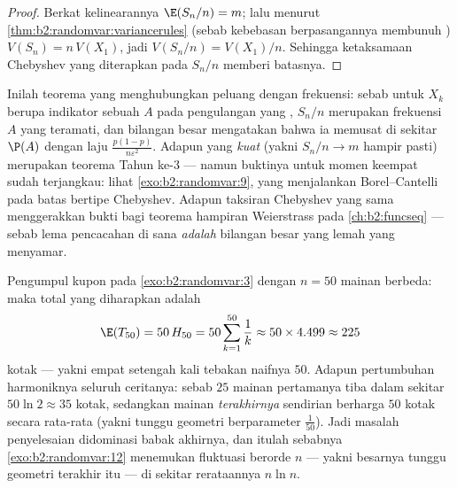 \begin{proof}
Berkat kelinearannya $\E(S_n/n) = m$; lalu menurut
\cref{thm:b2:randomvar:variancerules} (sebab kebebasan berpasangannya
membunuh ) $V(S_n) = n\,V(X_1)$, jadi $V(S_n/n) =
V(X_1)/n$. Sehingga ketaksamaan Chebyshev yang diterapkan pada $S_n/n$ memberi
batasnya.
\end{proof}

\begin{remark}
Inilah teorema yang menghubungkan peluang dengan frekuensi: sebab untuk
$X_k$ berupa indikator sebuah  $A$ pada pengulangan yang ,
$S_n/n$ merupakan frekuensi $A$ yang teramati, dan  bilangan
besar mengatakan bahwa ia memusat di sekitar $\P(A)$ dengan laju
$\frac{p(1-p)}{n\varepsilon^2}$. Adapun  yang \emph{kuat} (yakni $S_n/n \to
m$ hampir pasti) merupakan teorema Tahun ke-3 --- namun buktinya untuk
momen keempat sudah terjangkau: lihat \cref{exo:b2:randomvar:9},
yang menjalankan Borel--Cantelli pada batas bertipe Chebyshev. Adapun
taksiran Chebyshev yang sama menggerakkan bukti  bagi
teorema hampiran Weierstrass pada \cref{ch:b2:funcseq} --- sebab
lema pencacahan di sana \emph{adalah}  bilangan besar yang lemah
yang menyamar.
\end{remark}

\begin{example}
\label{ex:b2:randomvar:couponnumeric}
Pengumpul kupon pada \cref{exo:b2:randomvar:3} dengan $n =
50$ mainan berbeda: maka total yang diharapkan adalah
\[
\E(T_{50}) = 50\,H_{50} = 50\sum_{k=1}^{50}\frac1k
\approx 50 \times 4.499 \approx 225
\]
kotak --- yakni empat setengah kali tebakan naifnya $50$. Adapun
pertumbuhan harmoniknya seluruh ceritanya: sebab $25$ mainan pertamanya
tiba dalam sekitar $50\ln2 \approx 35$ kotak, sedangkan mainan
\emph{terakhirnya} sendirian berharga $50$ kotak secara rata-rata (yakni
tunggu geometri berparameter $\frac1{50}$). Jadi masalah
penyelesaian didominasi babak akhirnya, dan itulah sebabnya
\cref{exo:b2:randomvar:12} menemukan fluktuasi berorde $n$
--- yakni besarnya tunggu geometri terakhir itu --- di sekitar
rerataannya $n\ln n$.
\end{example}

